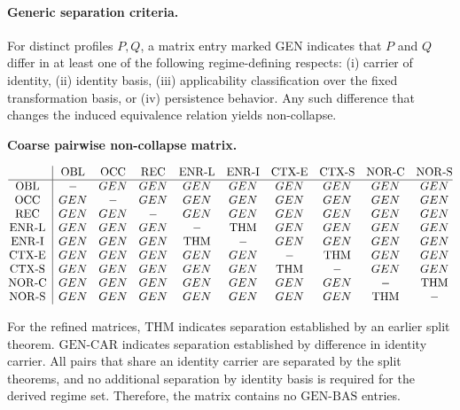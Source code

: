 \paragraph{Generic separation criteria.}
For distinct profiles $P,Q$, a matrix entry marked GEN indicates that
$P$ and $Q$ differ in at least one of the following regime-defining respects:
(i) carrier of identity,
(ii) identity basis,
(iii) applicability classification over the fixed transformation basis,
or (iv) persistence behavior.
Any such difference that changes the induced equivalence relation yields non-collapse.

\medskip
\noindent\textbf{Coarse pairwise non-collapse matrix.}

\[
\begin{array}{@{}c|ccccccccc@{}}
 & \mathrm{OBL} & \mathrm{OCC} & \mathrm{REC} & \mathrm{ENR\mbox{-}L} & \mathrm{ENR\mbox{-}I} & \mathrm{CTX\mbox{-}E} & \mathrm{CTX\mbox{-}S} & \mathrm{NOR\mbox{-}C} & \mathrm{NOR\mbox{-}S} \\
\hline
\mathrm{OBL} & -   & GEN & GEN & GEN & GEN & GEN & GEN & GEN & GEN \\
\mathrm{OCC} & GEN & -   & GEN & GEN & GEN & GEN & GEN & GEN & GEN \\
\mathrm{REC} & GEN & GEN & -   & GEN & GEN & GEN & GEN & GEN & GEN \\
\mathrm{ENR\mbox{-}L} & GEN & GEN & GEN & -   & \mathrm{THM} & GEN & GEN & GEN & GEN \\
\mathrm{ENR\mbox{-}I} & GEN & GEN & GEN & \mathrm{THM} & -   & GEN & GEN & GEN & GEN \\
\mathrm{CTX\mbox{-}E} & GEN & GEN & GEN & GEN & GEN & -   & \mathrm{THM} & GEN & GEN \\
\mathrm{CTX\mbox{-}S} & GEN & GEN & GEN & GEN & GEN & \mathrm{THM} & -   & GEN & GEN \\
\mathrm{NOR\mbox{-}C} & GEN & GEN & GEN & GEN & GEN & GEN & GEN & -   & \mathrm{THM} \\
\mathrm{NOR\mbox{-}S} & GEN & GEN & GEN & GEN & GEN & GEN & GEN & \mathrm{THM} & - \\
\end{array}
\]

\medskip
For the refined matrices,
$\mathrm{THM}$ indicates separation established by an earlier split theorem.
$\mathrm{GEN\mbox{-}CAR}$ indicates separation established by difference in identity carrier.
All pairs that share an identity carrier are separated by the split theorems,
and no additional separation by identity basis is required for the derived regime set.
Therefore, the matrix contains no $\mathrm{GEN\mbox{-}BAS}$ entries.

